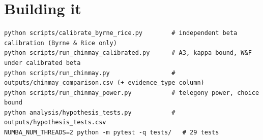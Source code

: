 \section{Building it}
\begin{lstlisting}[style=sh]
python scripts/calibrate_byrne_rice.py        # independent beta calibration (Byrne & Rice only)
python scripts/run_chinmay_calibrated.py      # A3, kappa bound, W&F under calibrated beta
python scripts/run_chinmay.py                 # outputs/chinmay_comparison.csv (+ evidence_type column)
python scripts/run_chinmay_power.py           # telegony power, choice bound
python analysis/hypothesis_tests.py           # outputs/hypothesis_tests.csv
NUMBA_NUM_THREADS=2 python -m pytest -q tests/   # 29 tests
\end{lstlisting}
